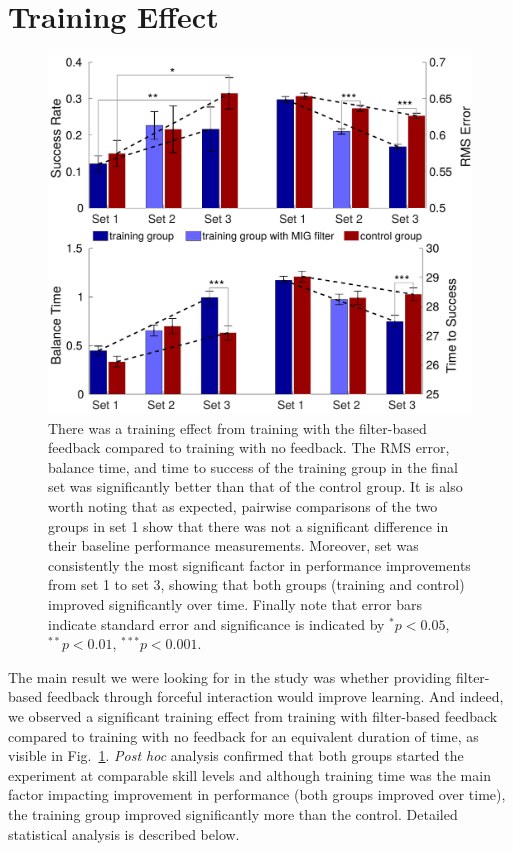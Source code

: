 \documentclass[12pt]{article}
\begin{document}
\section{Training Effect}

\begin{figure}[h]
	\begin{center}
		\includegraphics[width=\columnwidth]{training.pdf}
	\end{center}
	\caption{There was a training effect from training with the filter-based feedback compared to training with no feedback. The RMS error, balance time, and time to success of the training group in the final set was significantly better than that of the control group. It is also worth noting that as expected, pairwise comparisons of the two groups in set 1 show that there was not a significant difference in their baseline performance measurements. Moreover, set was consistently the most significant factor in performance improvements from set 1 to set 3, showing that both groups (training and control) improved significantly over time. Finally note that error bars indicate standard error and significance is indicated by $^*p<0.05$, $^{**}p<0.01$, $^{***}p<0.001$.}
	\label{fig: training}
\end{figure}

The main result we were looking for in the study was whether providing filter-based feedback through forceful interaction would improve learning. And indeed, we observed a significant training effect from training with filter-based feedback compared to training with no feedback for an equivalent duration of time, as visible in Fig.~\ref{fig: training}. \textit{Post hoc} analysis confirmed that both groups started the experiment at comparable skill levels and although training time was the main factor impacting improvement in performance (both groups improved over time), the training group improved significantly more than the control. Detailed statistical analysis is described below. 
\end{document}
